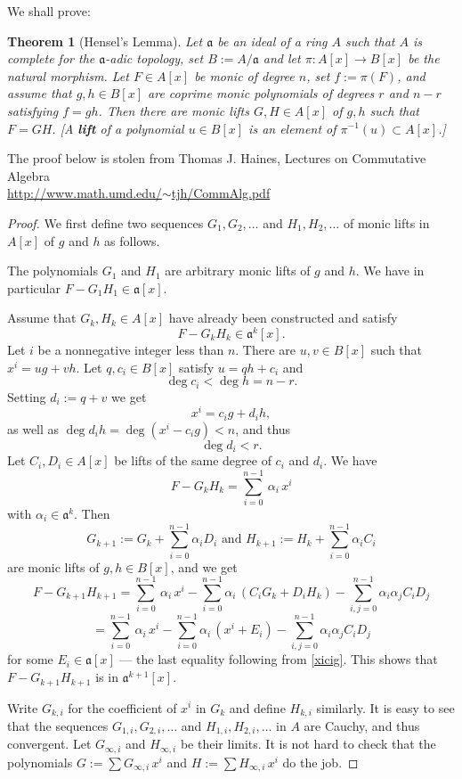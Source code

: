 \documentclass[12pt,letterpaper]{article}%
\newcommand{\mf}{\mathfrak}
\newcommand{\aaa}{\mf a}
\newtheorem{thm}{Theorem}%
\begin{document}
We shall prove:

\begin{thm}[Hensel's Lemma]\label{hl}
Let $\aaa$ be an ideal of a ring $A$ such that $A$ is complete for the $\aaa$-adic topology, set $B:=A/\aaa$ and let $\pi:A[x]\to B[x]$ be the natural morphism. Let $F\in A[x]$ be monic of degree $n$, set $f:=\pi(F)$, and assume that $g,h\in B[x]$ are coprime monic polynomials of degrees $r$ and $n-r$ satisfying $f=gh$. Then there are monic lifts $G,H\in A[x]$ of $g,h$ such that $F=GH$. [A \textbf{lift} of a polynomial $u\in B[x]$ is an element of $\pi^{-1}(u)\subset A[x]$.]
\end{thm}

The proof below is stolen from Thomas J. Haines, Lectures on Commutative Algebra \\\href{http://www.math.umd.edu/~tjh/CommAlg.pdf}{http://www.math.umd.edu/$\sim$tjh/CommAlg.pdf}

\begin{proof}
We first define two sequences $G_1,G_2,\ldots$ and $H_1,H_2,\ldots$ of monic lifts in $A[x]$ of $g$ and $h$ as follows. 

The polynomials $G_1$ and $H_1$ are arbitrary monic lifts of $g$ and $h$. We have in particular $F-G_1H_1\in\aaa[x]$. 

Assume that $G_k,H_k\in A[x]$ have already been constructed and satisfy 
$$
F-G_kH_k\in\aaa^k[x].
$$ 
Let $i$ be a nonnegative integer less than $n$. There are $u,v\in B[x]$ such that $x^i=ug+vh$. Let $q,c_i\in B[x]$ satisfy $u=qh+c_i$ and 
$$
\deg c_i<\deg h=n-r.
$$ 
Setting $d_i:=q+v$ we get 
\begin{equation}\label{xicig}
x^i=c_ig+d_ih,
\end{equation} 
as well as $\deg d_ih=\deg(x^i-c_ig)<n$, and thus 
$$
\deg d_i<r.
$$ 
Let $C_i,D_i\in A[x]$ be lifts of the same degree of $c_i$ and $d_i$. We have 
$$
F-G_kH_k=\sum_{i=0}^{n-1}\,\alpha_i\,x^i
$$ 
with $\alpha_i\in\aaa^k$. Then 
$$
G_{k+1}:=G_k+\sum_{i=0}^{n-1}\alpha_iD_i\text{ and }H_{k+1}:=H_k+\sum_{i=0}^{n-1}\alpha_iC_i
$$ 
are monic lifts of $g,h\in B[x]$, and we get 
$$
F-G_{k+1}H_{k+1}=\sum_{i=0}^{n-1}\,\alpha_i\,x^i-\sum_{i=0}^{n-1}\alpha_i\,(C_iG_k+D_iH_k)-\sum_{i,j=0}^{n-1}\alpha_i\alpha_jC_iD_j
$$ 
$$
=\sum_{i=0}^{n-1}\,\alpha_i\,x^i-\sum_{i=0}^{n-1}\alpha_i\,(x^i+E_i)-\sum_{i,j=0}^{n-1}\alpha_i\alpha_jC_iD_j
$$ 
for some $E_i\in\aaa[x]$ --- the last equality following from \eqref{xicig}. This shows that $F-G_{k+1}H_{k+1}$ is in $\aaa^{k+1}[x]$. 

Write $G_{k,i}$ for the coefficient of $x^i$ in $G_k$ and define $H_{k,i}$ similarly. It is easy to see that the sequences $G_{1,i},G_{2,i},\ldots$ and $H_{1,i},H_{2,i},\ldots$ in $A$ are Cauchy, and thus convergent. Let $G_{\infty,i}$ and $H_{\infty,i}$ be their limits. It is not hard to check that the polynomials $G:=\sum G_{\infty,i}\,x^i$ and $H:=\sum H_{\infty,i}\,x^i$ do the job.
\end{proof}
\end{document}
